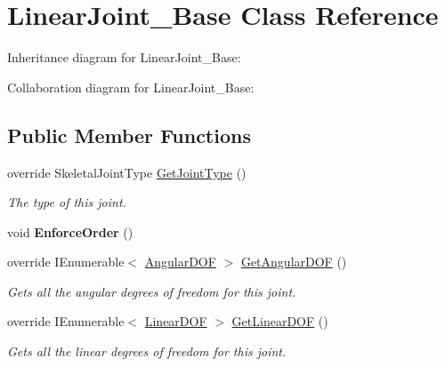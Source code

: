 \hypertarget{class_linear_joint___base}{}\section{Linear\+Joint\+\_\+\+Base Class Reference}
\label{class_linear_joint___base}


Inheritance diagram for Linear\+Joint\+\_\+\+Base\+:


Collaboration diagram for Linear\+Joint\+\_\+\+Base\+:
\subsection*{Public Member Functions}
\begin{DoxyCompactItemize}
\item 
override Skeletal\+Joint\+Type \hyperlink{class_linear_joint___base_aa162de1777f1daaa7ca2234fc6a913ab}{Get\+Joint\+Type} ()
\begin{DoxyCompactList}\small\item\em The type of this joint. \end{DoxyCompactList}\item 
\mbox{\label{class_linear_joint___base_ad02d167a9450f88f621a786f20fc5a7f}} 
void {\bfseries Enforce\+Order} ()
\item 
override I\+Enumerable$<$ \hyperlink{interface_angular_d_o_f}{Angular\+D\+OF} $>$ \hyperlink{class_linear_joint___base_a4f814a5b27b53d3d01ad39adbcd2b0bf}{Get\+Angular\+D\+OF} ()
\begin{DoxyCompactList}\small\item\em Gets all the angular degrees of freedom for this joint. \end{DoxyCompactList}\item 
override I\+Enumerable$<$ \hyperlink{interface_linear_d_o_f}{Linear\+D\+OF} $>$ \hyperlink{class_linear_joint___base_ad506a9bf378650ab1d6cdedab91ed2a5}{Get\+Linear\+D\+OF} ()
\begin{DoxyCompactList}\small\item\em Gets all the linear degrees of freedom for this joint. \end{DoxyCompactList}\end{DoxyCompactItemize}
